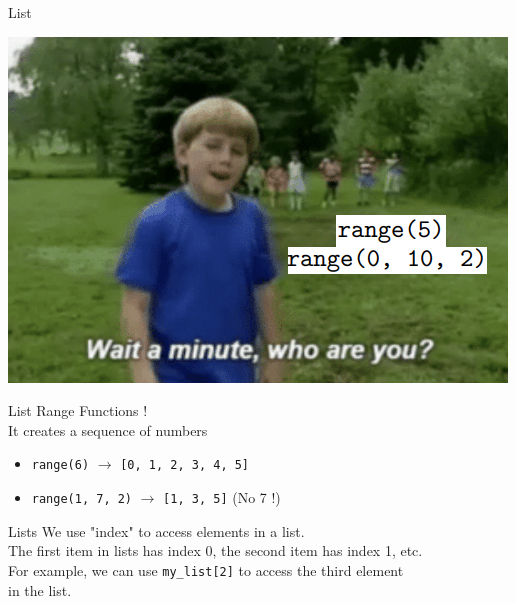 \documentclass{beamer}
\begin{document}
    \begin{frame}{List}
        \begin{center}
            \includegraphics[scale=0.6]{Who_are_you.png}
        \end{center}
        
    \end{frame}

    \begin{frame}{List}
        \color{blue} \Large Range Functions ! \\
        \color{black} \normalsize \vskip 10pt
        It creates a sequence of numbers
        \begin{itemize}
            \item \texttt{range(6)} $\rightarrow$ \texttt{[0, 1, 2, 3, 4, 5]}
            \item \texttt{range(1, 7, 2)} $\rightarrow$ \texttt{[1, 3, 5]} (No 7 !)
        \end{itemize}
    \end{frame}
    
    \begin{frame}{Lists}
        We use "index" to access elements in a list. \\
        The first item in lists has index 0, the second item has index 1, etc.\\
        For example, we can use \texttt{my\_list[2]} to access the third element\\
        in the list.
    \end{frame}
    
\end{document}
